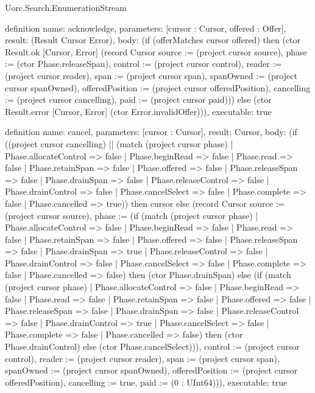 \begin{lexlean}{Uorc.Search.EnumerationStream}
\begin{semanticmodule}
definition{
  name: acknowledge,
  parameters: [cursor : Cursor, offered : Offer],
  result: (Result Cursor Error),
  body: (if (offerMatches cursor offered) then (ctor Result.ok [Cursor, Error] (record Cursor {source := (project cursor source), phase := (ctor Phase.releaseSpan), control := (project cursor control), reader := (project cursor reader), span := (project cursor span), spanOwned := (project cursor spanOwned), offeredPosition := (project cursor offeredPosition), cancelling := (project cursor cancelling), paid := (project cursor paid)})) else (ctor Result.error [Cursor, Error] (ctor Error.invalidOffer))),
  executable: true
}

definition{
  name: cancel,
  parameters: [cursor : Cursor],
  result: Cursor,
  body: (if ((project cursor cancelling) || (match (project cursor phase)
    | Phase.allocateControl => false
    | Phase.beginRead => false
    | Phase.read => false
    | Phase.retainSpan => false
    | Phase.offered => false
    | Phase.releaseSpan => false
    | Phase.drainSpan => false
    | Phase.releaseControl => false
    | Phase.drainControl => false
    | Phase.cancelSelect => false
    | Phase.complete => false
    | Phase.cancelled => true)) then cursor else (record Cursor {source := (project cursor source), phase := (if (match (project cursor phase)
    | Phase.allocateControl => false
    | Phase.beginRead => false
    | Phase.read => false
    | Phase.retainSpan => false
    | Phase.offered => false
    | Phase.releaseSpan => false
    | Phase.drainSpan => true
    | Phase.releaseControl => false
    | Phase.drainControl => false
    | Phase.cancelSelect => false
    | Phase.complete => false
    | Phase.cancelled => false) then (ctor Phase.drainSpan) else (if (match (project cursor phase)
    | Phase.allocateControl => false
    | Phase.beginRead => false
    | Phase.read => false
    | Phase.retainSpan => false
    | Phase.offered => false
    | Phase.releaseSpan => false
    | Phase.drainSpan => false
    | Phase.releaseControl => false
    | Phase.drainControl => true
    | Phase.cancelSelect => false
    | Phase.complete => false
    | Phase.cancelled => false) then (ctor Phase.drainControl) else (ctor Phase.cancelSelect))), control := (project cursor control), reader := (project cursor reader), span := (project cursor span), spanOwned := (project cursor spanOwned), offeredPosition := (project cursor offeredPosition), cancelling := true, paid := (0 : UInt64)})),
  executable: true
}


\end{semanticmodule}
\end{lexlean}
